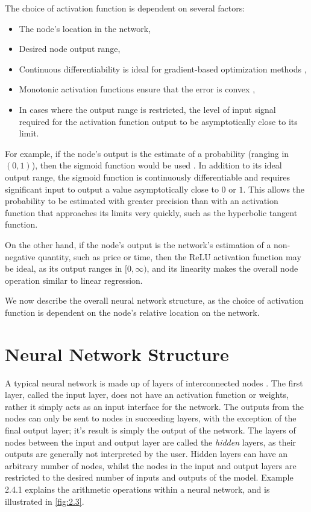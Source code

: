 \documentclass[honours,12pt, twoside]{unswthesis}
\numberwithin{equation}{section}
\theoremstyle{definition}
\begin{document}
The choice of activation function is dependent on several factors:
\begin{itemize}
\item The node's location in the network,
\item Desired node output range,
\item Continuous differentiability is ideal for gradient-based optimization methods \citep{snyman},
\item Monotonic activation functions ensure that the error is convex \citep{wu},
\item In cases where the output range is restricted, the level of input signal required for the activation function output to be asymptotically close to its limit.
\end{itemize}

For example, if the node's output is the estimate of a probability (ranging in $(0,1)$), then the sigmoid function would be used \citep{cybenko}. In addition to its ideal output range, the sigmoid function is continuously differentiable and requires significant input to output a value asymptotically close to $0$ or $1$. This allows the probability to be estimated with greater precision than with an activation function that approaches its limits very quickly, such as the hyperbolic tangent function.

On the other hand, if the node's output is the network's estimation of a non-negative quantity, such as price or time, then the ReLU activation function may be ideal, as its output ranges in $[0,\infty)$, and its linearity makes the overall node operation similar to linear regression.

We now describe the overall neural network structure, as the choice of activation function is dependent on the node's relative location on the network.
\section{Neural Network Structure}\label{sec:2.4}
A typical neural network is made up of layers of interconnected nodes \citep{neuralstat}. The first layer, called the input layer, does not have an activation function or weights, rather it simply acts as an input interface for the network. The outputs from the nodes can only be sent to nodes in succeeding layers, with the exception of the final output layer; it's result is simply the output of the network. The layers of nodes between the input and output layer are called the \textit{hidden} layers, as their outputs are generally not interpreted by the user. Hidden layers can have an arbitrary number of nodes, whilst the nodes in the input and output layers are restricted to the desired number of inputs and outputs of the model. Example 2.4.1 explains the arithmetic operations within a neural network, and is illustrated in \autoref{fig:2.3}.
\end{document}
